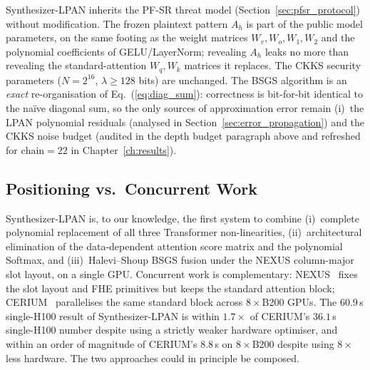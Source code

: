Synthesizer-LPAN inherits the PF-SR threat model (Section~\ref{sec:pfsr_protocol}) without modification. The frozen plaintext pattern $A_h$ is part of the public model parameters, on the same footing as the weight matrices $W_v, W_o, W_1, W_2$ and the polynomial coefficients of GELU/LayerNorm; revealing $A_h$ leaks no more than revealing the standard-attention $W_q, W_k$ matrices it replaces. The CKKS security parameters ($N = 2^{16}$, $\lambda \geq 128$ bits) are unchanged. The BSGS algorithm is an \emph{exact} re-organisation of Eq.~(\ref{eq:diag_sum}): correctness is bit-for-bit identical to the na\"ive diagonal sum, so the only sources of approximation error remain (i)~the LPAN polynomial residuals (analysed in Section~\ref{sec:error_propagation}) and the CKKS noise budget (audited in the depth budget paragraph above and refreshed for $\mathrm{chain} = 22$ in Chapter~\ref{ch:results}).

\subsection{Positioning vs.\ Concurrent Work}

Synthesizer-LPAN is, to our knowledge, the first system to combine (i)~complete polynomial replacement of all three Transformer non-linearities, (ii)~architectural elimination of the data-dependent attention score matrix and the polynomial Softmax, and (iii)~Halevi--Shoup BSGS fusion under the NEXUS column-major slot layout, on a single GPU. Concurrent work is complementary: NEXUS~\cite{zhang2024nexus} fixes the slot layout and FHE primitives but keeps the standard attention block; CERIUM~\cite{cerium2025} parallelises the same standard block across $8\times$B200 GPUs. The 60.9\,s single-H100 result of Synthesizer-LPAN is within $1.7\times$ of CERIUM's $36.1$\,s single-H100 number despite using a strictly weaker hardware optimiser, and within an order of magnitude of CERIUM's $8.8$\,s on $8\times$B200 despite using $8\times$ less hardware. The two approaches could in principle be composed.
